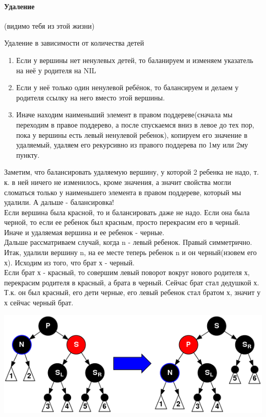 \documentclass[a4paper,10pt]{article}
\begin{document}
\paragraph{Удаление}(видимо тебя из этой жизни)\\
\begin{center} Удаление в зависимости от количества детей \end{center}
\begin{enumerate}
	\item Если у вершины нет ненулевых детей, то баланируем и изменяем указатель на неё у родителя на NIL
	\item Если у неё только один ненулевой ребёнок, то балансируем и делаем у родителя ссылку на него вместо этой вершины.
	\item Иначе находим наименьший элемент в правом поддереве(сначала мы переходим в правое поддерево, а после спускаемся вниз в левое до тех пор, пока у вершины есть левый ненулевой ребенок), копируем его значение в удаляемый, удаляем его рекурсивно из правого поддерева по 1му или 2му пункту.
\end{enumerate}
Заметим, что балансировать удаляемую вершину, у которой 2 ребенка не надо, т. к. в ней ничего не изменилось, кроме значения, а значит свойства могли сломаться только у наименьшего элемента в правом поддереве, который мы удалили.
А дальше - балансировка!\\
Если вершина была красной, то и балансировать даже не надо.
Если она была черной, то если ее ребенок был красным, просто перекрасим его в черный.\\
Иначе и удаляемая вершина и ее ребенок - черные.\\
Дальше рассматриваем случай, когда n - левый ребенок. Правый симметрично.
Итак, удалили вершину n, на ее месте теперь ребенок n и он черный(нзовем его х). Исходим из того, что брат х - черный.\\
Если брат х - красный, то совершим левый поворот вокруг нового родителя х, перекрасим родителя в красный, а брата в черный. Сейчас брат стал дедушкой х. Т.к. он был красный, его дети черные, его левый ребенок стал братом х, значит у х сейчас черный брат.\\
\begin{center}\includegraphics[scale=0.7]{rbt_del_1.png}\end{center} 
\end{document}
